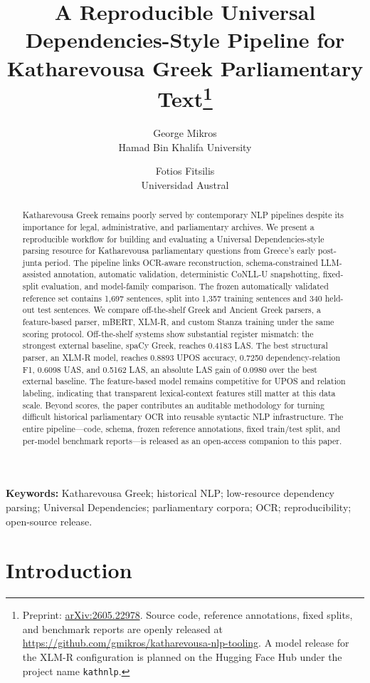 \documentclass[11pt]{article}
\title{A Reproducible Universal Dependencies-Style Pipeline for
Katharevousa Greek Parliamentary Text\thanks{%
Preprint: \href{https://arxiv.org/abs/2605.22978}{arXiv:2605.22978}.
Source code, reference annotations, fixed splits, and benchmark reports are
openly released at \url{https://github.com/gmikros/katharevousa-nlp-tooling}.
A model release for the XLM-R configuration is planned on the Hugging Face
Hub under the project name \texttt{kathnlp}.}}
\author{
George Mikros\\
Hamad Bin Khalifa University
\and
Fotios Fitsilis\\
Universidad Austral
}
\date{}
\begin{document}
\maketitle

\begin{abstract}
Katharevousa Greek remains poorly served by contemporary NLP pipelines despite its importance for legal, administrative, and parliamentary archives. We present a reproducible workflow for building and evaluating a Universal Dependencies-style parsing resource for Katharevousa parliamentary questions from Greece's early post-junta period. The pipeline links OCR-aware reconstruction, schema-constrained LLM-assisted annotation, automatic validation, deterministic CoNLL-U snapshotting, fixed-split evaluation, and model-family comparison. The frozen automatically validated reference set contains 1{,}697 sentences, split into 1{,}357 training sentences and 340 held-out test sentences. We compare off-the-shelf Greek and Ancient Greek parsers, a feature-based parser, mBERT, XLM-R, and custom Stanza training under the same scoring protocol. Off-the-shelf systems show substantial register mismatch: the strongest external baseline, spaCy Greek, reaches 0.4183 LAS. The best structural parser, an XLM-R model, reaches 0.8893 UPOS accuracy, 0.7250 dependency-relation F1, 0.6098 UAS, and 0.5162 LAS, an absolute LAS gain of 0.0980 over the best external baseline. The feature-based model remains competitive for UPOS and relation labeling, indicating that transparent lexical-context features still matter at this data scale. Beyond scores, the paper contributes an auditable methodology for turning difficult historical parliamentary OCR into reusable syntactic NLP infrastructure. The entire pipeline---code, schema, frozen reference annotations, fixed train/test split, and per-model benchmark reports---is released as an open-access companion to this paper.
\end{abstract}

\noindent\textbf{Keywords:} Katharevousa Greek; historical NLP; low-resource dependency parsing; Universal Dependencies; parliamentary corpora; OCR; reproducibility; open-source release.

\section{Introduction}
\end{document}
